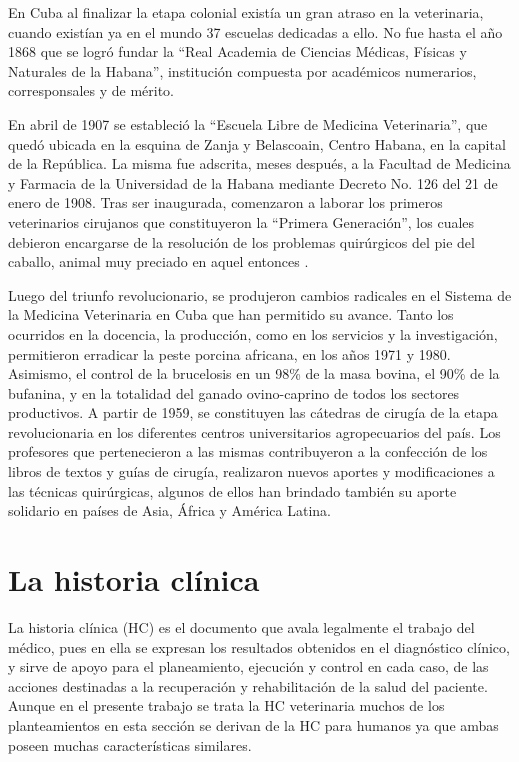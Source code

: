 En Cuba al finalizar la etapa colonial existía un gran atraso en la veterinaria, cuando existían ya en el mundo 37 escuelas dedicadas a ello. No fue hasta el año 1868 que se logró fundar la “Real Academia de Ciencias Médicas, Físicas y Naturales de la Habana”, institución compuesta por académicos numerarios, corresponsales y de mérito.  

En abril de 1907 se estableció la “Escuela Libre de Medicina Veterinaria”, que quedó ubicada en la esquina de Zanja y Belascoain, Centro Habana, en la capital de la República. La misma fue adscrita, meses después, a la Facultad de Medicina y Farmacia de la Universidad de la Habana mediante Decreto No. 126 del 21 de enero de 1908. Tras ser inaugurada, comenzaron a laborar los primeros veterinarios cirujanos que constituyeron la “Primera Generación”, los cuales debieron encargarse de la resolución de los problemas quirúrgicos del pie del caballo, animal muy preciado en aquel entonces .  

Luego del triunfo revolucionario, se produjeron cambios radicales en el Sistema de la Medicina Veterinaria en Cuba que han permitido su avance. Tanto los ocurridos en la docencia, la producción, como en los servicios y la investigación, permitieron erradicar la peste porcina africana, en los años 1971 y 1980. Asimismo, el control de la brucelosis en un 98\% de la masa bovina, el 90\% de la bufanina, y en la totalidad del ganado ovino-caprino de todos los sectores productivos.  A partir de 1959, se constituyen las cátedras de cirugía  de la etapa revolucionaria en los diferentes centros universitarios agropecuarios del país. Los profesores que pertenecieron a las mismas contribuyeron a la confección de los libros de textos y guías de cirugía, realizaron nuevos aportes y modificaciones a las técnicas quirúrgicas, algunos de ellos han brindado también su aporte solidario en países de Asia, África y América Latina. 

\section{La historia clínica}

La historia clínica (HC) es el documento que avala legalmente el trabajo del médico, pues en ella se expresan los resultados obtenidos en el diagnóstico clínico, y sirve de apoyo para el planeamiento, ejecución y control en cada caso, de las acciones destinadas a la recuperación y rehabilitación de la salud del paciente. Aunque en el presente trabajo se trata la HC veterinaria muchos de los planteamientos en esta sección se derivan de la HC para humanos ya que ambas poseen muchas características similares. 

